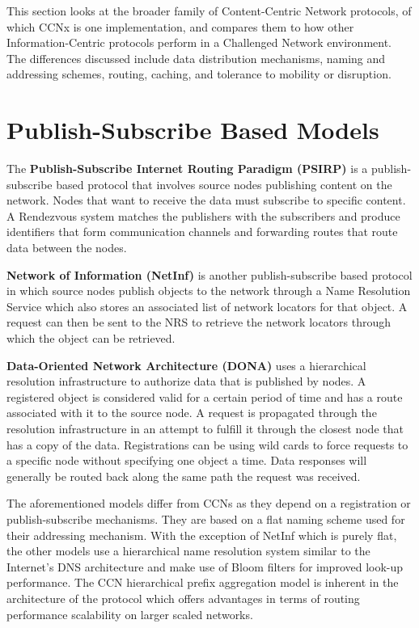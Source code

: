 \documentclass[a4paper,12pt]{report}      %
\begin{document}
This section looks at the broader family of Content-Centric Network protocols, of which CCNx is one
implementation, and compares them to how other Information-Centric protocols perform in a
Challenged Network environment. The differences discussed include data distribution mechanisms,
naming and addressing schemes, routing, caching, and tolerance to mobility or disruption\cite{dirk2941}.

\section{Publish-Subscribe Based Models}

The \textbf{Publish-Subscribe Internet Routing Paradigm (PSIRP)} is a publish-subscribe based protocol
that involves source nodes publishing content on the network. Nodes that want to receive the data must
subscribe to specific content. A Rendezvous system matches the publishers with the subscribers and
produce identifiers that form communication channels and forwarding routes that route data between
the nodes.

\textbf{Network of Information (NetInf)} is another publish-subscribe based protocol in which source nodes
publish objects to the network through a Name Resolution Service which also stores an associated list
of network locators for that object. A request can then be sent to the NRS to retrieve the network
locators through which the object can be retrieved.

\textbf{Data-Oriented Network Architecture (DONA)} uses a hierarchical resolution infrastructure to
authorize data that is published by nodes. A registered object is considered valid for a certain period of
time and has a route associated with it to the source node. A request is propagated through the
resolution infrastructure in an attempt to fulfill it through the closest node that has a copy of the data.
Registrations can be using wild cards to force requests to a specific node without specifying one object
a time. Data responses will generally be routed back along the same path the request was received.

The aforementioned models differ from CCNs as they depend on a registration or publish-subscribe
mechanisms. They are based on a flat naming scheme used for their addressing mechanism. With the
exception of NetInf which is purely flat, the other models use a hierarchical name resolution system
similar to the Internet's DNS architecture and make use of Bloom filters for improved look-up
performance. The CCN hierarchical prefix aggregation model is inherent in the architecture of the
protocol which offers advantages in terms of routing performance scalability on larger scaled networks\cite{dirk2941}.
\end{document}
